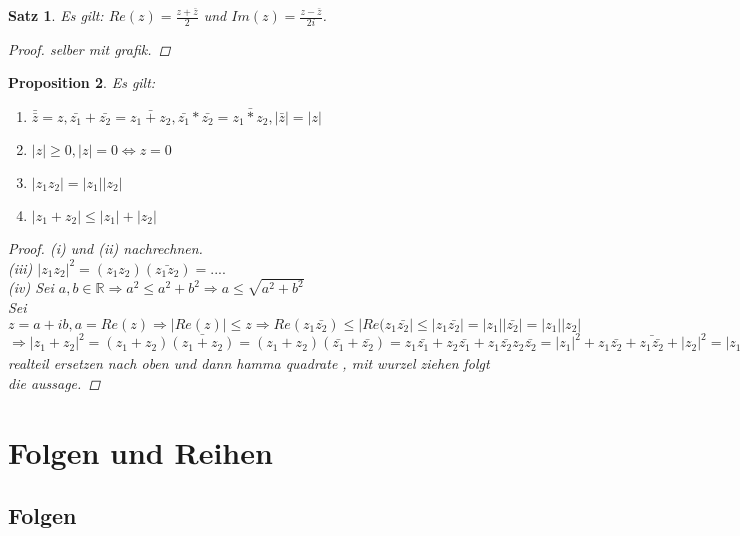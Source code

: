 \documentclass[a4paper,titlepage,oneside]{article}
\def\R{\ensuremath{\mathbb{R}} }
\def\im{\ensuremath{\mathit{i}} }
\newcommand{\abs}[1]{\ensuremath{\left|#1\right|}}
\theoremstyle{thmstyle}
\newtheorem{satz}{Satz}[subsection]
\newtheorem{prop}[satz]{Proposition}
\begin{document}
\begin{satz}
Es gilt: $Re(z) = \frac{z + \bar{z}}{2}$ und $Im(z) = \frac{z - \bar{z}}{2\im}$.
\begin{proof} selber mit grafik. %
\end{proof}
\end{satz}

\begin{prop}
Es gilt:
\begin{enumerate}[label=(\roman*)]
\item \( \bar{\bar{z}} = z, \bar{z_1} + \bar{z_2} = \bar{z_1 + z_2}, \bar{z_1} * \bar{z_2} = \bar{z_1 * z_2}, \abs{\bar{z}} = \abs{z} \)
\item \( \abs{z} \ge 0, \abs{z} = 0 \Leftrightarrow z = 0\)
\item \(\abs{z_1 z_2} = \abs{z_1} \abs{z_2}\)
\item \(\abs{z_1 + z_2} \le \abs{z_1} + \abs{z_2}\)
\end{enumerate}
\begin{proof}
(i) und (ii) nachrechnen.  \\ %
(iii) \(\abs{z_1 z_2}^2 = (z_1 z_2)(\bar{z_1 z_2}) =  .... \) \\   %
(iv) Sei $a, b \in \R \Rightarrow a^2 \le a^2 + b^2 \Rightarrow a \le \sqrt{a^2 + b^2}$ \\
Sei $ z = a + \im b , a = Re(z) \Rightarrow \abs{Re(z)} \le z \Rightarrow Re(z_1 \bar{z_2}) \le \abs{Re(z_1 \bar{z_2}} \le \abs{z_1 \bar{z_2}} = \abs{z_1}\abs{\bar{z_2}} = \abs{z_1}\abs{z_2}$
$\Rightarrow \abs{z_1 + z_2}^2 = (z_1 + z_2)\bar{(z_1 + z_2)} = (z_1 + z_2)(\bar{z_1} + \bar{z_2}) = z_1\bar{z_1} + z_2\bar{z_1} + z_1\bar{z_2} z_2\bar{z_2} = \abs{z_1}^2 + z_1\bar{z_2} + \bar{z_1\bar{z_2}} + \abs{z_2}^2 = |z_1|^2 + 2 Re (z1 \bar{z2}) + |z_2|^2 \le $ realteil ersetzen nach oben und dann hamma quadrate , mit wurzel ziehen folgt die aussage. %
\end{proof}
\end{prop}

\section{Folgen und Reihen}
\subsection{Folgen}
\end{document}
